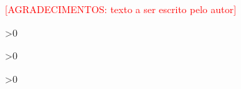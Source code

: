 \documentclass[
    12pt,               %
    oneside,            %
    a4paper,            %
    chapter=TITLE,      %
    section=TITLE,      %
    english,            %
    brazilian,             %
    article             %
]{abntex2}
\newcommand{\pendente}[1]{\textcolor{red}{[#1]}}
\begin{document}

\frenchspacing


\pretextual

\imprimircapa

\imprimirfolhaderosto

%     

\imprimirfolhadabanca

\begin{agradecimentos}
    \pendente{AGRADECIMENTOS: texto a ser escrito pelo autor}
\end{agradecimentos}
\newpage


\ifnum{}>0
    \listoffigures*
    \cleardoublepage
    \newpage
\fi

\ifnum{}>0
    \listofquadros*
    \cleardoublepage
    \newpage
\fi

\ifnum{}>0
    \listoftables*
    \cleardoublepage
    \newpage
\fi
\end{document}
